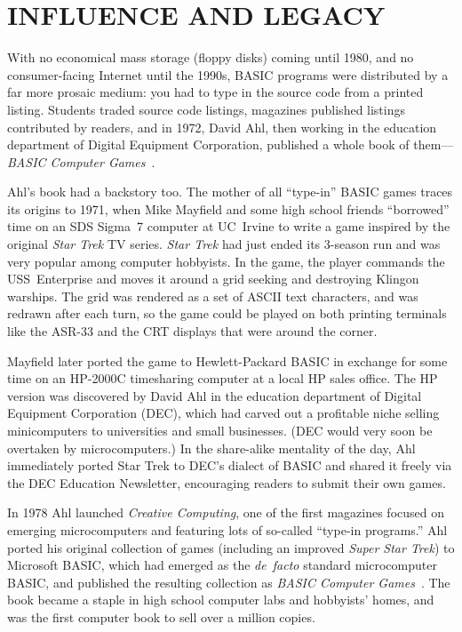 

\section{INFLUENCE AND LEGACY}


With no economical mass storage (floppy disks) coming until 1980, and no
consumer-facing Internet until the 1990s, BASIC programs were
distributed by a far more prosaic medium: you had to type in the source
code from a printed listing.  Students traded source code listings, 
magazines published listings contributed by readers, and in 1972, David
Ahl, then working in the education department of Digital Equipment
Corporation, published a whole book of them---\emph{BASIC Computer
  Games}~\cite{basic_computer_games}. 

Ahl's book had a backstory too.
The mother of all ``type-in'' BASIC games traces its origins to
1971, when Mike Mayfield and some high school friends ``borrowed'' time
on an SDS Sigma~7 computer at UC~Irvine to write a game inspired by the
original \emph{Star Trek} TV series.  \emph{Star Trek} had just ended its 3-season run and
was very popular among computer hobbyists.
In the game, the player commands the USS~Enterprise and moves it around
a grid seeking and destroying Klingon warships.  The grid was rendered
as a set of ASCII text characters, and was redrawn after each turn, so
the game could be played on both printing terminals like the ASR-33 and
the CRT displays that were around the corner.

Mayfield later ported the game to Hewlett-Packard BASIC in exchange for
some time on an HP-2000C timesharing computer at a local HP sales
office.
The HP version was discovered by David Ahl in the education department
of  Digital Equipment
Corporation (DEC), which had carved out a profitable niche selling
minicomputers to
universities and small businesses.  (DEC would very soon be overtaken by
microcomputers.)  In the share-alike mentality of the day, Ahl
immediately ported Star Trek to DEC's dialect of BASIC and shared it freely via the DEC
Education Newsletter, encouraging readers to submit their own games.

In 1978 Ahl launched \emph{Creative Computing}, one of the first
magazines focused on emerging microcomputers and featuring lots of
so-called ``type-in programs.''
Ahl ported his original collection of games (including an improved
\emph{Super Star Trek}) to Microsoft BASIC, which had emerged as the
\emph{de~facto} standard microcomputer BASIC, and published the
resulting collection as \emph{BASIC Computer
Games}~\cite{basic_computer_games}.
The book became a staple in high school computer labs and hobbyists'
homes, and was the first computer book to sell over a million copies.

